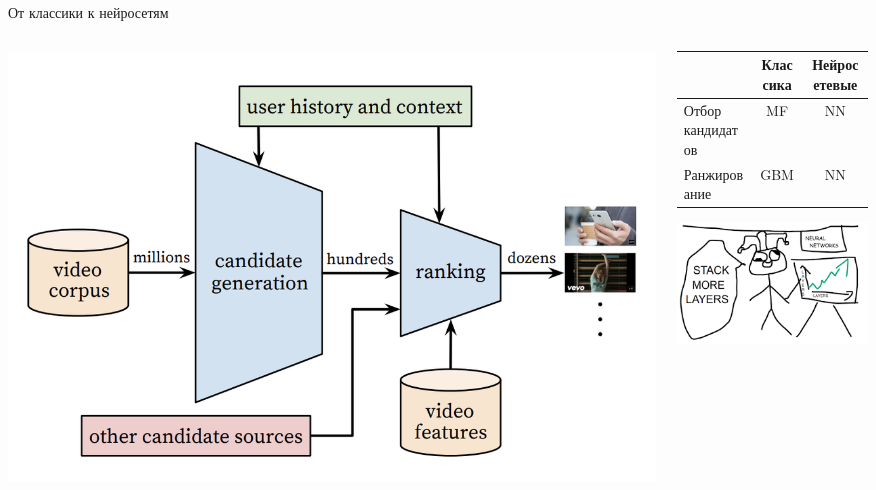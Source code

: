 \documentclass[11pt,aspectratio=169]{beamer}
\begin{document}
\begin{frame}{От классики к нейросетям}

\begin{columns}
\begin{column}{0.4\textwidth} 
\begin{center}
\includegraphics[scale=0.3]{images/youtube-arch.png}
\end{center}
\end{column}
\begin{column}{0.5\textwidth}

\begin{small}
\begin{tabular}{l c c}
 & Классика & Нейросетевые \\
\hline
Отбор кандидатов & MF & NN \\
Ранжирование & GBM & NN
\end{tabular}

\begin{center}
\includegraphics[scale=0.5]{images/layers.png}
\end{center}

\end{small}

\end{column}
\end{columns}

\end{frame}
\end{document}

